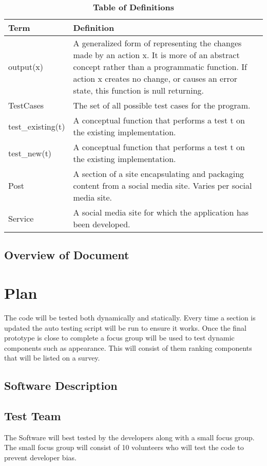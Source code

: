 \documentclass[12pt, titlepage]{article}
\begin{document}
\begin{table}[!htb]
\caption{\textbf{Table of Definitions}} \label{Table}
\begin{tabularx}{\textwidth}{p{3cm}X}
\toprule
\textbf{Term} & \textbf{Definition}\\
\midrule
output(x) & A generalized form of representing the changes made by an action x. It is more of an abstract concept rather than a programmatic function. If action x creates no change, or causes an error state, this function is null returning.\\
TestCases & The set of all possible test cases for the program. \\
test\_existing(t) & A conceptual function that performs a test t on the existing implementation. \\
test\_new(t) & A conceptual function that performs a test t on the existing implementation. \\
Post & A section of a site encapsulating and packaging content from a social media site. Varies per social media site. \\
Service & A social media site for which the application has been developed. \\
\bottomrule
\end{tabularx}
\end{table}	

\subsection{Overview of Document}
\section{Plan}
The code will be tested both dynamically and statically. Every time a section is updated the auto testing script will be run to ensure it works. Once the final prototype is close to complete a focus group will be used to test dynamic components such as appearance. This will consist of them ranking components that will be listed on a survey.	
\subsection{Software Description}
\subsection{Test Team}
The Software will best tested by the developers along with a small focus group. The small focus group will consist of 10 volunteers who will test the code to prevent developer bias. 
\end{document}
